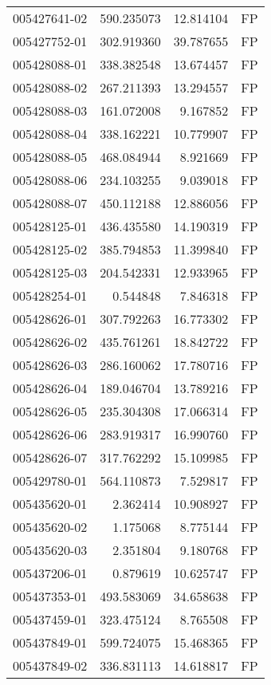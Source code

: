 \begin{tabular}{lrrl}
005427641-02 &  590.235073 &    12.814104 &   FP \\
005427752-01 &  302.919360 &    39.787655 &   FP \\
005428088-01 &  338.382548 &    13.674457 &   FP \\
005428088-02 &  267.211393 &    13.294557 &   FP \\
005428088-03 &  161.072008 &     9.167852 &   FP \\
005428088-04 &  338.162221 &    10.779907 &   FP \\
005428088-05 &  468.084944 &     8.921669 &   FP \\
005428088-06 &  234.103255 &     9.039018 &   FP \\
005428088-07 &  450.112188 &    12.886056 &   FP \\
005428125-01 &  436.435580 &    14.190319 &   FP \\
005428125-02 &  385.794853 &    11.399840 &   FP \\
005428125-03 &  204.542331 &    12.933965 &   FP \\
005428254-01 &    0.544848 &     7.846318 &   FP \\
005428626-01 &  307.792263 &    16.773302 &   FP \\
005428626-02 &  435.761261 &    18.842722 &   FP \\
005428626-03 &  286.160062 &    17.780716 &   FP \\
005428626-04 &  189.046704 &    13.789216 &   FP \\
005428626-05 &  235.304308 &    17.066314 &   FP \\
005428626-06 &  283.919317 &    16.990760 &   FP \\
005428626-07 &  317.762292 &    15.109985 &   FP \\
005429780-01 &  564.110873 &     7.529817 &   FP \\
005435620-01 &    2.362414 &    10.908927 &   FP \\
005435620-02 &    1.175068 &     8.775144 &   FP \\
005435620-03 &    2.351804 &     9.180768 &   FP \\
005437206-01 &    0.879619 &    10.625747 &   FP \\
005437353-01 &  493.583069 &    34.658638 &   FP \\
005437459-01 &  323.475124 &     8.765508 &   FP \\
005437849-01 &  599.724075 &    15.468365 &   FP \\
005437849-02 &  336.831113 &    14.618817 &   FP \\

\end{tabular}
